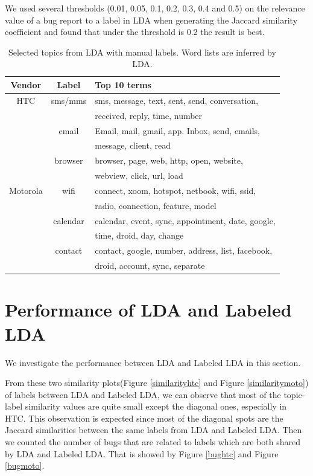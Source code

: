 \documentclass[10pt, conference, compsocconf]{IEEEtran}
\begin{document}
We used several thresholds (0.01, 0.05, 0.1, 0.2, 0.3, 0.4 and 0.5) on
the relevance value of a bug report to a label in LDA when generating
the Jaccard similarity coefficient and found that under the threshold
is 0.2 the result is best.


\begin{table}[!t]
\renewcommand{\arraystretch}{1.3}
\caption{Selected topics from LDA with manual labels. Word lists are inferred by LDA.}
\label{seleted2}
\centering
\begin{tabular}{|c||c||l|}
\hline
Vendor & Label & Top 10 terms\\
\hline
HTC & sms\//mms &sms, message, text, sent, send, conversation, \\
            && received, reply, time, number \\ \cline{2-3}
  & email & Email, mail, gmail, app. Inbox, send, emails, \\
            &&message, client, read \\ \cline{2-3}
  & browser&browser, page, web, http, open, website, \\
            &&webview, click, url, load\\
\hline
Motorola & wifi &connect, xoom, hotspot, netbook, wifi, ssid, \\
           &&radio, connection, feature, model\\ \cline{2-3}
    &calendar& calendar, event, sync, appointment, date, google, \\
           &&time, droid, day, change \\ \cline{2-3}
    &contact & contact, google, number, address, list, facebook, \\
           &&droid, account, sync, separate \\
\hline
\end{tabular}
\end{table}


\section{Performance of LDA and Labeled LDA}
We investigate the performance between LDA and Labeled LDA in this section.

From these two similarity plots(Figure \ref{similarityhtc} and Figure \ref{similaritymoto}) of labels between LDA and Labeled LDA, we can observe that most of the topic-label similarity values are quite small except the diagonal ones, especially in HTC. This observation is expected since most of the diagonal spots are the Jaccard similarities between the same labels from LDA and Labeled LDA. Then we counted the number of bugs that are related to labels which are both shared by LDA and Labeled LDA. That is showed by Figure \ref{bughtc} and Figure \ref{bugmoto}.
\end{document}

